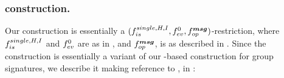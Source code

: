 
\subsubsection{\CUASGSMDO construction.} %
Our \CUASGSMDO construction is essentially a $(f_{is}^{single,H,I},f_{ev}^0,
f_{op}^{\boldsymbol{msg}})$-\CUASGen restriction, where $f_{is}^{single,H,I}$ and
$f_{ev}^0$ are as in , and $f_{op}^{\boldsymbol{msg}}$, is as
described in . Since the construction is essentially a variant
of our \CUASGen-based construction for group signatures, we describe it making
reference to \CUASGS, in :

